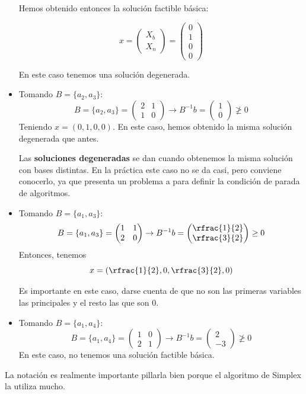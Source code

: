 \begin{example}
\begin{itemize}
		Hemos obtenido entonces la solución factible básica:

		\[x = \begin{pmatrix}X_b\\\hline X_n\end{pmatrix} = \begin{pmatrix}0\\1\\\hline0\\0\end{pmatrix}\]

		En este caso tenemos una solución degenerada. 

	\item Tomando $B = \{a_2,a_3\}$:
		\[B = \{a_2,a_3\} = \begin{pmatrix}2&1\\1&0\end{pmatrix} \to B^{-1}b = \begin{pmatrix}1\\0\end{pmatrix} \not\geq 0\]
	 	Teniendo $x = (0,1,0,0)$. En este caso, hemos obtenido la misma solución degenerada que antes.

	 	Las \textbf{soluciones degeneradas} se dan cuando obtenemos la misma solución con bases distintas. En la práctica este caso no se da casi, pero conviene conocerlo, ya que presenta un problema a para definir la condición de parada de algoritmos.


	\item Tomando $B = \{a_1,a_3\}$:
		\[B = \{a_1,a_3\} = \begin{pmatrix}1&1\\2&0\end{pmatrix} \to B^{-1}b = \begin{pmatrix}\rfrac{1}{2}\\\rfrac{3}{2}\end{pmatrix} \geq 0\]
		Entonces, tenemos \[x = (\rfrac{1}{2},0,\rfrac{3}{2},0)\]

		Es importante en este caso, darse cuenta de que no son las primeras variables las principales y el resto las que son 0. 
	\item Tomando $B = \{a_1,a_4\}$:
		\[B = \{a_1,a_4\} = \begin{pmatrix}1&0\\2&1\end{pmatrix} \to B^{-1}b = \begin{pmatrix}2\\-3\end{pmatrix} \not\geq 0\]
		En este caso, no tenemos una solución factible básica.
	
\end{itemize}

\obs La notación es realmente importante pillarla bien porque el algoritmo de Simplex la utiliza mucho.

\end{example}

